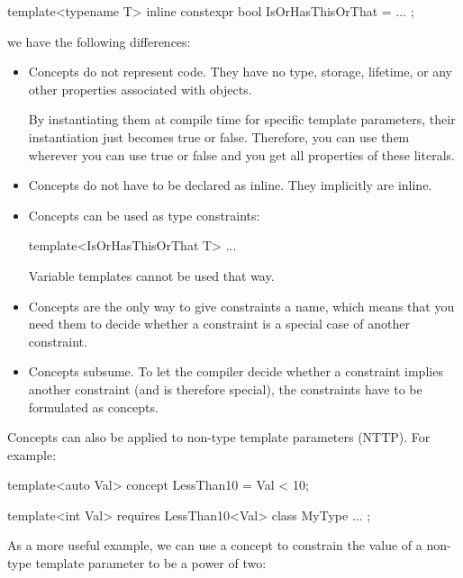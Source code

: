 \begin{cpp}
template<typename T>
inline constexpr bool IsOrHasThisOrThat = ... ;
\end{cpp}

we have the following differences:

\begin{itemize}
\item
Concepts do not represent code. They have no type, storage, lifetime, or any other properties associated with objects.

By instantiating them at compile time for specific template parameters, their instantiation just becomes true or false. Therefore, you can use them wherever you can use true or false and you get all properties of these literals.

\item
Concepts do not have to be declared as inline. They implicitly are inline.

\item
Concepts can be used as type constraints:

\begin{cpp}
template<IsOrHasThisOrThat T>
...
\end{cpp}

Variable templates cannot be used that way.

\item
Concepts are the only way to give constraints a name, which means that you need them to decide whether a constraint is a special case of another constraint.

\item
Concepts subsume. To let the compiler decide whether a constraint implies another constraint (and is therefore special), the constraints have to be formulated as concepts.
\end{itemize}


Concepts can also be applied to non-type template parameters (NTTP). For example:

\begin{cpp}
template<auto Val>
concept LessThan10 = Val < 10;

template<int Val>
requires LessThan10<Val>
class MyType {
	...
};
\end{cpp}

As a more useful example, we can use a concept to constrain the value of a non-type template parameter to be a power of two:

